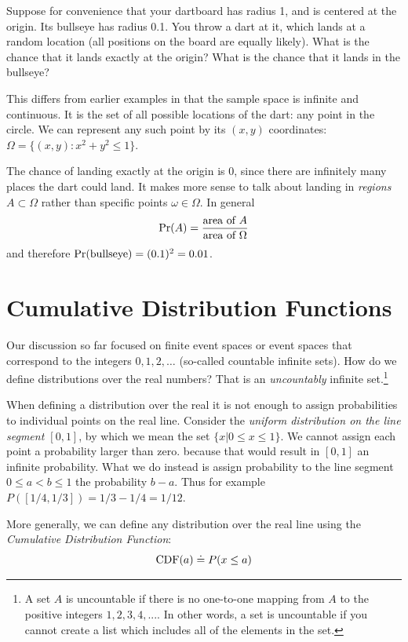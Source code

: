 Suppose for convenience that your dartboard has radius 1, and is
centered at the origin. Its bullseye has radius 0.1. You throw a dart
at it, which lands at a random location (all positions on the board
are equally likely). What is the chance that it lands exactly at the
origin? What is the chance that it lands in the bullseye?

This differs from earlier examples in that the sample space is infinite and continuous. It is the set of all possible locations of the dart: any point in the circle. We can represent any such point by its $(x,y)$ coordinates: $\Omega = \{(x,y): x^2 + y^2 \leq 1\}$.

The chance of landing exactly at the origin is 0, since there are infinitely many places the dart could land. It makes more sense to talk about landing in {\it regions} $A \subset \Omega$ rather than specific points $\omega \in \Omega$. In general
$$ \mbox{\rm Pr}(A) = \frac{\mbox{area of $A$}}{\mbox{area of $\Omega$}} $$
and therefore $\mbox{\rm Pr}(\mbox{bullseye}) = (0.1)^2 = 0.01$.

\section{Cumulative Distribution Functions}

Our discussion so far focused on finite event spaces or event spaces
that correspond to the integers $0,1,2,\ldots$ (so-called countable
infinite sets). How do we define distributions over the real numbers?
That is an {\em uncountably} infinite set.\footnote{A set $A$ is
  uncountable if there is no one-to-one mapping from $A$ to the
  positive integers $1,2,3,4,...$. In other words, a set is
  uncountable if you cannot create a list which includes all of the
  elements in the set.}

When defining a distribution over the real it is not enough to assign
probabilities to individual points on the real line. Consider the {\em
  uniform distribution on the line segment $[0,1]$}, by which
we mean the set $\{x | 0 \leq x \leq 1\}$. We cannot assign each
point a probability larger than zero. because that would result in
$[0,1]$ an infinite probability. What we do instead is assign
probability to the line segment $0 \leq a < b \leq 1$ the probability
$b-a$. Thus for example $P([1/4,1/3])=1/3-1/4 = 1/12$.

More generally, we can define any distribution over the real line
using the {\em Cumulative Distribution Function}:
\[
\mbox{CDF}(a) \doteq P(x \leq a)
\]

